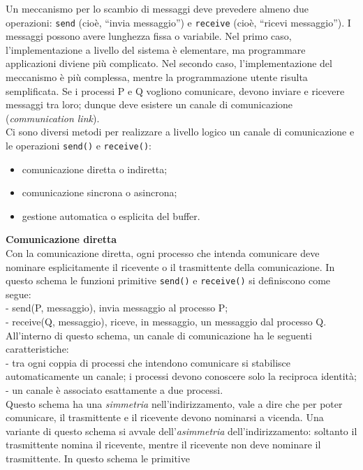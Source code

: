 \documentclass[11pt,a4paper]{article}
\begin{document}
Un meccanismo per lo scambio di messaggi deve prevedere almeno due operazioni: \texttt{send} (cioè, “invia messaggio”) e \texttt{receive} (cioè, “ricevi messaggio”). I messaggi possono
avere lunghezza fissa o variabile. Nel primo caso, l'implementazione a livello del sistema è
elementare, ma programmare applicazioni diviene più complicato. Nel secondo caso, l'implementazione del meccanismo è più complessa, mentre la programmazione utente risulta
semplificata.
Se i processi P e Q vogliono comunicare, devono inviare e ricevere messaggi tra loro;
dunque deve esistere un canale di comunicazione (\emph{communication link}).
\medskip\\
Ci sono diversi metodi per realizzare a livello logico un canale di comunicazione e le ope­razioni \texttt{send()} e \texttt{receive()}:
\begin{itemize}[noitemsep, leftmargin=*]
  \item comunicazione diretta o indiretta;
  \item comunicazione sincrona o asincrona;
  \item gestione automatica o esplicita del buffer.
\end{itemize}
%
\textbf{Comunicazione diretta}\\
Con la comunicazione diretta, ogni processo che intenda comunicare deve nominare
esplicitamente il ricevente o il trasmittente della comunicazione. In questo schema le fun­zioni primitive \texttt{send()} e \texttt{receive()} si definiscono come segue:\medskip\\
- send(P, messaggio), invia messaggio al processo P;\medskip\\
- receive(Q, messaggio), riceve, in messaggio, un messaggio dal processo Q.\medskip\\
All'interno di questo schema, un canale di comunicazione ha le seguenti caratteristiche:\medskip\\
- tra ogni coppia di processi che intendono comunicare si stabilisce automaticamente
un canale; i processi devono conoscere solo la reciproca identità;\medskip\\
- un canale è associato esattamente a due processi.\medskip\\
Questo schema ha una \emph{simmetria} nell'indirizzamento, vale a dire che per poter comu­nicare, il trasmittente e il ricevente devono nominarsi a vicenda. Una variante di questo
schema si avvale dell'\emph{asimmetria} dell'indirizzamento: soltanto il trasmittente nomina il rice­vente, mentre il ricevente non deve nominare il trasmittente. In questo schema le primitive
\end{document}
